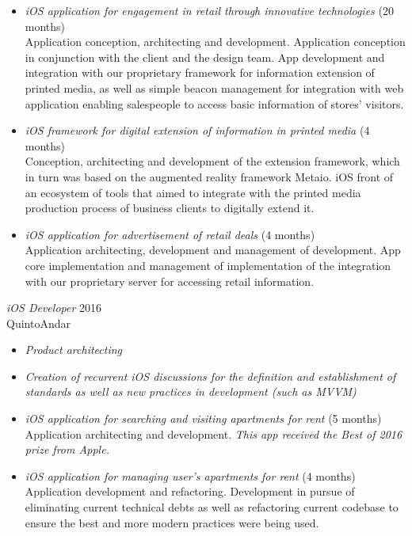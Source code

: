 \documentclass[]{res} %
\newcommand{\sbt}{\,\begin{picture}(-1,1)(-2,-3)\circle*{2}\end{picture}\ }
\def \myitemback{0.55cm}
\def \myitemsep{0pt}
\def \mypositionface{\sl}
\def \myorgface{\sc}
\newif\ifgames
\begin{document}
\begin{resume}
\begin{itemize}[itemsep=\myitemsep,leftmargin=\myitemback]
\ifgames
    \vfill
\else
\fi

\item[\sbt] {\it iOS application for engagement in retail through innovative technologies} \hfill (20 months)\\
Application conception, architecting and development. Application conception in conjunction with the client and the design team. App development and integration with our proprietary framework for information extension of printed media, as well as simple beacon management for integration with web application enabling salespeople to access basic information of stores' visitors.
\item[\sbt] {\it iOS framework for digital extension of information in printed media} \hfill (4 months)\\
Conception, architecting and development of the extension framework, which in turn was based on the augmented reality framework Metaio. iOS front of an ecosystem of tools that aimed to integrate with the printed media production process of business clients to digitally extend it.

\ifgames
\else
    \vfill
\fi

\item[\sbt] {\it iOS application for advertisement of retail deals} \hfill (4 months)\\
Application architecting, development and management of development. App core implementation and management of implementation of the integration with our proprietary server for accessing retail information.
\end{itemize}

{\mypositionface iOS Developer} \hfill 2016\\
{\myorgface QuintoAndar}

\begin{itemize}[itemsep=\myitemsep,leftmargin=\myitemback]
\item[\sbt] {\it Product architecting}
\item[\sbt] {\it Creation of recurrent iOS discussions for the definition and establishment of standards as well as new practices in development (such as MVVM)}

\item[\sbt] {\it iOS application for searching and visiting apartments for rent} \hfill (5 months)\\
Application architecting and development. {\it This app received the Best of 2016 prize from Apple.} 
\item[\sbt] {\it iOS application for managing user's apartments for rent} \hfill (4 months)\\
Application development and refactoring. Development in pursue of eliminating current technical debts as well as refactoring current codebase to ensure the best and more modern practices were being used.


\end{itemize}
\end{resume}
\end{document}
